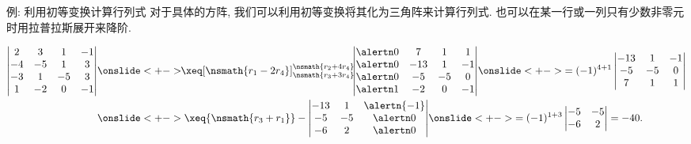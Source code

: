 \begin{frame}{例: 利用初等变换计算行列式}
	\onslide<+->
	对于具体的方阵, 我们可以利用初等变换将其化为三角阵来计算行列式.
	\onslide<+->
	也可以在某一行或一列只有少数非零元时用拉普拉斯展开来降阶.
	\onslide<+->
	\begin{example}
		\begin{align*}
			\begin{vmatrix}
				2& 3& 1&-1\\
				-4&-5& 1& 3\\
				-3& 1&-5& 3\\
				1&-2& 0&-1
			\end{vmatrix}
			&\onslide<+->{\!\!\xeq[\nsmath{r_1-2r_4}]{\substack{\nsmath{r_2+4r_4}\\\nsmath{r_3+3r_4}}}\!\!
			\begin{vmatrix}
				\alertn0& 7& 1&1\\
				\alertn0&-13& 1&-1\\
				\alertn0&-5&-5&0\\
				\alertn1&-2& 0&-1
			\end{vmatrix}}
			\onslide<+->{=(-1)^{4+1}\begin{vmatrix}
				-13& 1&-1\\
				-5&-5&0\\
					7& 1&1
				\end{vmatrix}}\\
			&\onslide<+->{\xeq{\nsmath{r_3+r_1}}
			-\begin{vmatrix}
				-13& 1&\alertn{-1}\\
				-5&-5&\alertn0\\
				-6& 2&\alertn0
			\end{vmatrix}}
			\onslide<+->{=(-1)^{1+3}\begin{vmatrix}
				-5&-5\\-6&2
			\end{vmatrix}=-40.}
		\end{align*}
	\end{example}
\end{frame}


